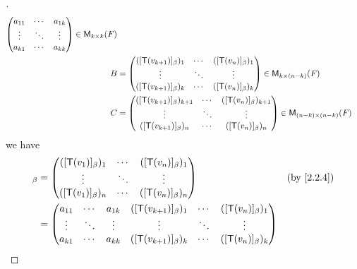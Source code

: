 \begin{proof}[]
\begin{align*}
\begin{pmatrix}
            a_{1 1} & \cdots & a_{1 k} \\
            \vdots  & \ddots & \vdots  \\
            a_{k 1} & \cdots & a_{k k}
          \end{pmatrix} \in \ms[k][k][\F]                                                                    \\
    B & = \begin{pmatrix}
            ([\T(v_{k + 1})]_{\beta})_1 & \cdots & ([\T(v_n)]_{\beta})_1 \\
            \vdots                      & \ddots & \vdots                \\
            ([\T(v_{k + 1})]_{\beta})_k & \cdots & ([\T(v_n)]_{\beta})_k
          \end{pmatrix} \in \ms[k][(n - k)][\F]             \\
    C & = \begin{pmatrix}
            ([\T(v_{k + 1})]_{\beta})_{k + 1} & \cdots & ([\T(v_n)]_{\beta})_{k + 1} \\
            \vdots                            & \ddots & \vdots                      \\
            ([\T(v_{k + 1})]_{\beta})_n       & \cdots & ([\T(v_n)]_{\beta})_n
          \end{pmatrix} \in \ms[(n - k)][(n - k)][\F]
  \end{align*}
  we have
  \begin{align*}
    [\T]_{\beta} & = \begin{pmatrix}
                       ([\T(v_1)]_{\beta})_1 & \cdots & ([\T(v_n)]_{\beta})_1   \\
                       \vdots                & \ddots & \vdots                  \\
                       ([\T(v_1)]_{\beta})_n & \cdots & ([\T(v_n)]_{\beta})_{n}
                     \end{pmatrix}                                        &  & \by{2.2.4}                                        \\
                 & = \begin{pmatrix}
                       a_{1 1} & \cdots & a_{1 k} & ([\T(v_{k + 1})]_{\beta})_1       & \cdots & ([\T(v_n)]_{\beta})_1       \\
                       \vdots  & \ddots & \vdots  & \vdots                            & \ddots & \vdots                      \\
                       a_{k 1} & \cdots & a_{k k} & ([\T(v_{k + 1})]_{\beta})_k       & \cdots & ([\T(v_n)]_{\beta})_k       \\

\end{pmatrix}
\end{align*}
\end{proof}
